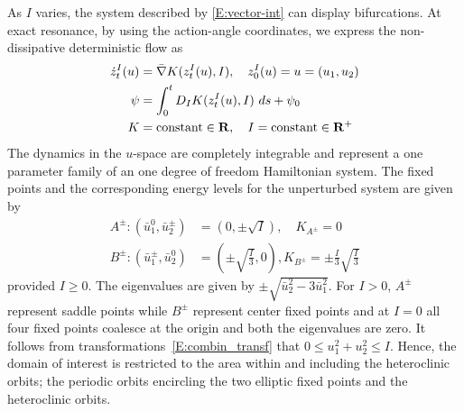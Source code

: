 
As $I$ varies, the system described by \eqref{E:vector-int} can display bifurcations. At exact resonance, by using the action-angle coordinates, we express the non-dissipative deterministic flow as
\begin{equation}
\label{E:hamilflow}
\begin{aligned}
\dot z_t^I(u) &= \bar{\nabla} K(z_t^I(u), I), \quad z_0^I(u)=u =(u_1,u_2)\\
\psi &= \int_{0}^{t} {D_{I} K(z_t^I(u), I) \ ds} + \psi_{0} \\ K
&= \text{constant} \in \mathbf R, \quad I = \text{constant} \in \mathbf R^+
\end{aligned}
\end{equation}
The dynamics in the $u$-space are completely integrable and represent a one parameter family of an one degree of freedom Hamiltonian system. The fixed points and the corresponding energy levels for the unperturbed system are given by
\begin{equation}
\begin{aligned}
A^\pm: (\bar u_1^{0}, \bar u_2^\pm) &= (0, \pm \sqrt{I}), \quad K_{A^\pm} = 0 \\
B^\pm: (\bar u_1^\pm, \bar u_2^{0}) & = (\pm \sqrt{\frac{I}{3}},0),  K_{B^\pm} = \pm\frac{I}{3}\sqrt{\frac{I}{3}}
\end{aligned}
\label{E:fixed-points}
\end{equation}
provided $ I \ge 0 $. The eigenvalues are given by $\pm \sqrt{\bar u_2^2-3 \bar u_1^2 }$. For $I > 0$, $A^\pm$ represent saddle points while $B^\pm$ represent center fixed points and at $I = 0$ all four fixed points coalesce at the origin and both the eigenvalues are zero. It follows from transformations~\eqref{E:combin_transf} that $0 \le u_1^2+u_2^2 \le I$. Hence, the domain of interest is restricted to the area within and including the heteroclinic orbits; the periodic orbits encircling the two elliptic fixed points and the heteroclinic orbits.


